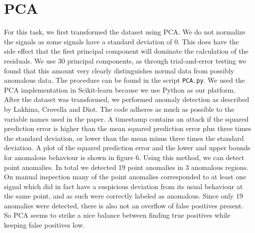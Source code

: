 \documentclass[]{article}
\begin{document}
\section{PCA}
For this task, we first transformed the dataset using PCA. We do not normalize the signals as some signals have a standard deviation of 0. This does have the side effect that the first principal component will dominate the calculation of the residuals. We use 30 principal components, as through trial-and-error testing we found that this amount very clearly distinguishes normal data from possibly anomalous data. The procedure can be found in the script \texttt{PCA.py}. We used the PCA implementation in Scikit-learn because we use Python as our platform. After the dataset was transformed, we performed anomaly detection as described by Lakhina, Crovella and Diot\cite{lakhina2004diagnosing}. The code adheres as much as possible to the variable names used in the paper. A timestamp contains an attack if the squared prediction error is higher than the mean squared prediction error plus three times the standard deviation, or lower than the mean minus three times the standard deviation. A plot of the squared prediction error and the lower and upper bounds for anomalous behaviour is shown in figure 6. Using this method, we can detect point anomalies. In total we detected 19 point anomalies in 3 anomalous regions. On manual inspection many of the point anomalies corresponded to at least one signal which did in fact have a suspicious deviation from its usual behaviour at the same point, and as such were correctly labeled as anomalous. Since only 19 anomalies were detected, there is also not an overflow of false positives present. So PCA seems to strike a nice balance between finding true positives while keeping false positives low.
 
\end{document}
